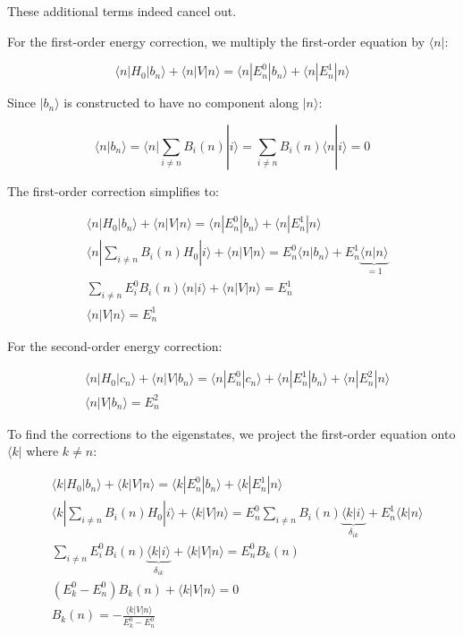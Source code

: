 These additional terms indeed cancel out.

For the first-order energy correction, we multiply the first-order equation by $\langle n|$:

\begin{equation}
\langle n|H_0|b_n\rangle+\langle n|V|n\rangle=\langle n|E_n^0|b_n\rangle+\langle n|E_n^1|n\rangle
\end{equation}

Since $|b_n\rangle$ is constructed to have no component along $|n\rangle$:

\begin{equation}
\langle n|b_n\rangle=\langle n|\sum_{i\neq n}B_i(n)|i\rangle=\sum_{i\neq n}B_i(n)\langle n|i\rangle=0
\end{equation}

The first-order correction simplifies to:

\begin{align}
&\langle n|H_0|b_n\rangle+\langle n|V|n\rangle=\langle n|E_n^0|b_n\rangle+\langle n|E_n^1|n\rangle\\
&\langle n|\sum_{i\neq n}B_i(n)H_0|i\rangle+\langle n|V|n\rangle=E_n^0\langle n|b_n\rangle+E_n^1\underbrace{\langle n|n\rangle}_{=1}\\
&\sum_{i\neq n}E_i^0B_i(n)\langle n|i\rangle+\langle n|V|n\rangle=E_n^1 \\
&\langle n|V|n\rangle=E_n^1
\end{align}

For the second-order energy correction:

\begin{align}
&\langle n|H_0|c_n\rangle+\langle n|V|b_n\rangle=\langle n|E_n^0|c_n\rangle+\langle n|E_n^1|b_n\rangle+\langle n|E_n^2|n\rangle\\
&\langle n|V|b_n\rangle=E_n^2
\end{align}

To find the corrections to the eigenstates, we project the first-order equation onto $\langle k|$ where $k\neq n$:

\begin{align}
&\langle k|H_0|b_n\rangle+\langle k|V|n\rangle=\langle k|E_n^0|b_n\rangle+\langle k|E_n^1|n\rangle\\
&\langle k|\sum_{i\neq n}B_i(n)H_0|i\rangle+\langle k|V|n\rangle=E_n^0\sum_{i\neq n}B_i(n)\underbrace{\langle k|i\rangle}_{\delta_{ik}}+E_n^1\langle k|n\rangle\\
&\sum_{i\neq n}E_i^0B_i(n)\underbrace{\langle k|i\rangle}_{\delta_{ik}}+\langle k|V|n\rangle=E_n^0B_k(n) \\
&(E_k^0-E_n^0)B_k(n)+\langle k|V|n\rangle=0\\
&B_k(n)=-\frac{\langle k|V|n\rangle}{E_k^0-E_n^0}
\end{align}

